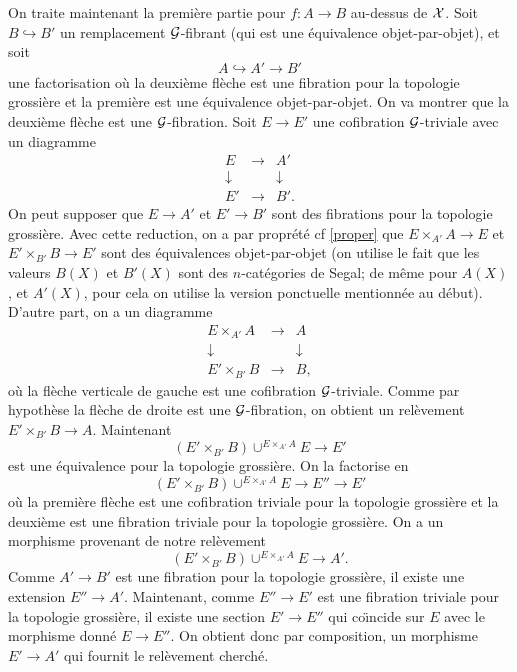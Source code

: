 \documentclass[12pt]{article}
\newcommand{\Gg}{{\cal G}}
\newcommand{\Xx}{{\cal X}}
\begin{document}
On traite maintenant la premi\`ere partie pour $f:A\rightarrow B$ au-dessus de
$\Xx$. Soit $B\hookrightarrow B'$ un remplacement $\Gg$-fibrant
(qui est une \'equivalence objet-par-objet), et soit
$$
A\hookrightarrow A'\rightarrow B'
$$
une factorisation o\`u la deuxi\`eme fl\`eche est une fibration pour la
topologie
grossi\`ere et la premi\`ere est une \'equivalence objet-par-objet.
On va montrer que la deuxi\`eme fl\`eche est une $\Gg$-fibration. Soit
$E\rightarrow
E'$ une cofibration $\Gg$-triviale avec un diagramme
$$
\begin{array}{ccc}
E&\rightarrow & A'\\
\downarrow && \downarrow \\
E'&\rightarrow & B'.
\end{array}
$$
On peut supposer que $E\rightarrow A'$ et $E'\rightarrow B'$ sont des fibrations
pour la topologie grossi\`ere. Avec cette reduction, on a par propr\'et\'e
cf \ref{proper} que
$E\times _{A'}A\rightarrow E$ et $E'\times _{B'}B\rightarrow E'$ sont des
\'equivalences objet-par-objet (on utilise le fait que les valeurs  $B(X)$ et
$B'(X)$ sont des $n$-cat\'egories de Segal; de m\^eme pour $A(X)$, et $A'(X)$,
pour cela on utilise la version ponctuelle mentionn\'ee au d\'ebut).
D'autre part,
on  a un diagramme
$$
\begin{array}{ccc}
E\times _{A'}A&\rightarrow & A\\
\downarrow && \downarrow \\
E'\times _{B'}B&\rightarrow & B,
\end{array}
$$
o\`u la fl\`eche verticale de gauche est une cofibration $\Gg$-triviale.
Comme par hypoth\`ese la fl\`eche de droite est une $\Gg$-fibration,
on obtient un rel\`evement $E'\times _{B'}B\rightarrow A$.
Maintenant
$$
(E'\times _{B'}B)\cup ^{E\times _{A'}A}E\rightarrow E'
$$
est une \'equivalence pour la topologie grossi\`ere.
On la factorise en
$$
(E'\times _{B'}B)\cup ^{E\times _{A'}A}E\rightarrow E''\rightarrow E'
$$
o\`u la premi\`ere fl\`eche est une cofibration triviale pour la topologie
grossi\`ere et la deuxi\`eme est une fibration triviale pour la
topologie grossi\`ere. On a un morphisme provenant de notre rel\`evement
$$
(E'\times _{B'}B) \cup ^{E\times _{A'}A}E \rightarrow A'.
$$
Comme $A'\rightarrow B'$ est une fibration pour la
topologie grossi\`ere, il existe une extension $E''\rightarrow A'$.
Maintenant, comme $E''\rightarrow E'$ est une fibration triviale pour
la topologie grossi\`ere, il existe une section $E'\rightarrow E''$
qui co\"{\i}ncide sur $E$ avec le morphisme donn\'e $E\rightarrow E''$.
On obtient donc par composition, un morphisme $E'\rightarrow A'$ qui fournit le
rel\`evement cherch\'e.
\end{document}
